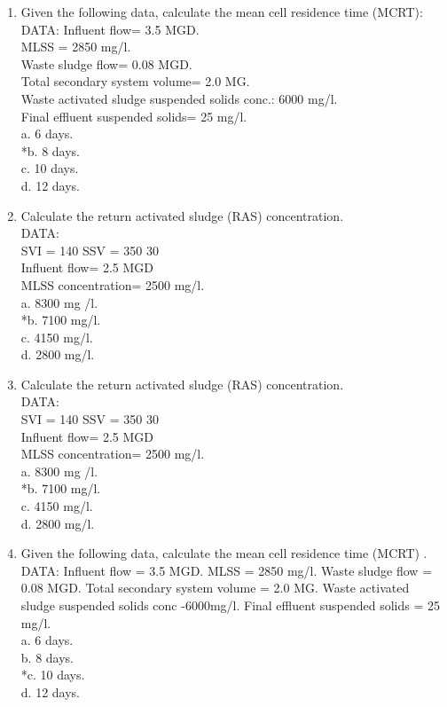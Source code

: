 \begin{enumerate}
\item Given the following data, calculate the mean cell residence time (MCRT):\\
DATA:  Influent flow= 3.5 MGD.  \\
MLSS = 2850 mg/l.  \\
Waste sludge flow= 0.08 MGD.  \\
Total secondary system volume= 2.0 MG.  \\
Waste activated sludge suspended solids conc.: 6000 mg/l.  \\
Final effluent suspended solids= 25 mg/l. \\
a. 6 days. \\
*b. 8 days. \\
c. 10 days. \\
d. 12 days. \\


\item Calculate the return activated sludge (RAS) concentration.\\
DATA:\\
SVI = 140 SSV  = 350 30\\
Influent flow= 2.5 MGD\\
MLSS concentration= 2500 mg/l. \\
a. 8300 mg /l. \\
*b. 7100 mg/l. \\
c. 4150 mg/l. \\
d. 2800 mg/l. \\

\item Calculate the return activated sludge (RAS) concentration.\\
DATA:\\
SVI = 140 SSV  = 350 30\\
Influent flow= 2.5 MGD\\
MLSS concentration= 2500 mg/l. \\
a. 8300 mg /l. \\
*b. 7100 mg/l. \\
c. 4150 mg/l. \\
d. 2800 mg/l. \\

\item Given the following data, calculate the mean cell residence time (MCRT) . \\
DATA: Influent flow = 3.5 MGD. MLSS = 2850 mg/l. Waste sludge flow = 0.08 MGD. Total secondary system volume = 2.0 MG. Waste activated sludge suspended solids conc -6000mg/l. Final effluent suspended solids = 25 mg/l. \\
a. 6 days. \\
b. 8 days. \\
*c. 10 days. \\
d. 12 days. \\



\end{enumerate}
